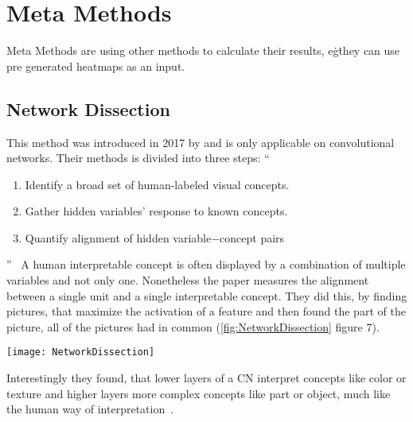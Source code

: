 \section{Meta Methods}
Meta Methods are using other methods to calculate their results, e\.g\. they can use pre generated heatmaps as an input.

\subsection{Network Dissection}
This method was introduced in 2017 by  and is only applicable on convolutional networks. Their methods is divided into three steps: 
“
\begin{enumerate}
    \item  Identify a broad set of human-labeled visual concepts. 
    \item Gather hidden variables’ response to known concepts.
    \item Quantify alignment of hidden variable−concept pairs
\end{enumerate}
”~\cite[2]{Bau.2017}
A human interpretable concept is often displayed by a combination of multiple variables and not only one. Nonetheless the paper measures the alignment between a single unit and a single interpretable concept. 
They did this, by finding pictures, that maximize the activation of a feature and then found the part of the picture, all of the pictures had in common (\cref{fig:NetworkDissection} figure 7).
\begin{figure*}[h]
    \center
    \texttt{[image: NetworkDissection]}
    \caption{Network Dissection,~\cite{Bau.2017}}\label{fig:NetworkDissection}
\end{figure*}

Interestingly they found, that lower layers of a CN interpret concepts like color or texture and higher layers more complex concepts like part or object, much like the human way of interpretation~\cite{Bau.2017}.

